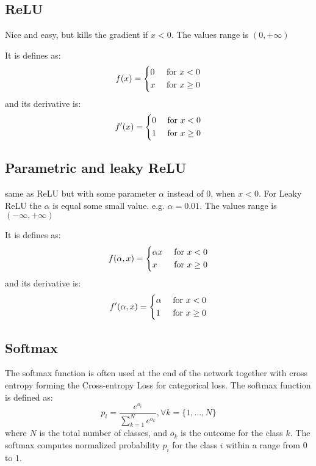 \documentclass{article}
\begin{document}
\subsection{ReLU}
Nice and easy, but kills the gradient if $x<0$. The values range is $(0,+ \infty)$

It is defines as:
\begin{equation}
     \label{25}
	f(x)= 
	\begin{dcases}
    	0 & \text{ for } x < 0 \\
    	x & \text{ for } x \geq 0
	\end{dcases}
\end{equation}
and its derivative is:
\begin{equation}
     \label{25}
	f'(x)= 
	\begin{dcases}
    	0 & \text{ for } x < 0 \\
    	1 & \text{ for } x \geq 0
	\end{dcases}
\end{equation}
\subsection{Parametric and leaky ReLU}
same as ReLU but with some parameter $\alpha$ instead of 0, when $x<0$. For Leaky ReLU the $\alpha$ is equal some small value. e.g. $\alpha=0.01$. The values range is $(- \infty,+ \infty)$

It is defines as:
\begin{equation}
     \label{25}
	f(\alpha, x)= 
	\begin{dcases}
    	\alpha x & \text{ for } x < 0 \\
    	x & \text{ for } x \geq 0
	\end{dcases}
\end{equation}
and its derivative is:
\begin{equation}
     \label{25}
	f'(\alpha, x)= 
	\begin{dcases}
    	\alpha & \text{ for } x < 0 \\
    	1 & \text{ for } x \geq 0
	\end{dcases}
\end{equation}



\subsection{Softmax}
The softmax function is often used at the end of the network together with cross entropy forming the Cross-entropy Loss for categorical loss. The softmax function is defined as:
\begin{equation}
    \label{1}
    p_i = \frac{e^{o_i}}{\sum_{k=1}^{N} e^{o_k}}, \forall k = \{1, ..., N\}
\end{equation}
where $N$ is the total number of classes, and $o_k$ is the outcome for the class $k$. The softmax computes normalized probability $p_i$ for the class $i$ within a range from 0 to 1.
\end{document}
